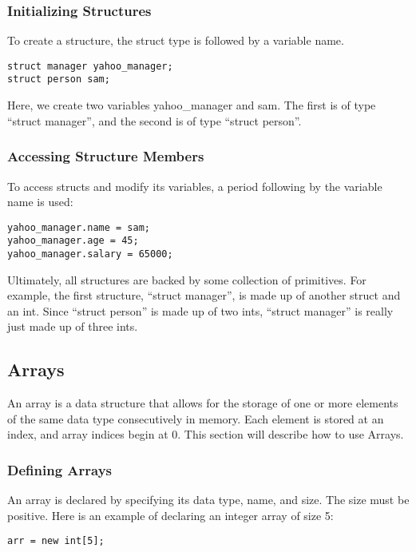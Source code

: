 \documentclass{article}
\begin{document}
\subsubsection{Initializing Structures}
To create a structure, the struct type is followed by a variable name. 
\begin{lstlisting}
struct manager yahoo_manager;
struct person sam;
\end{lstlisting}

Here, we create two variables yahoo\_manager and sam. The first is of type ``struct manager'', and the second is of type ``struct person''.

\subsubsection{Accessing Structure Members}

 To access structs and modify its variables, a period following by the variable name is used:

 \begin{lstlisting}
yahoo_manager.name = sam;
yahoo_manager.age = 45;
yahoo_manager.salary = 65000;
\end{lstlisting}

Ultimately, all structures are backed by some collection of primitives. For example, the first structure, ``struct manager'', is made up of another struct and an int. Since ``struct person'' is made up of two ints, ``struct manager'' is really just made up of three ints. 


\subsection{Arrays}
An array is a data structure that allows for the storage of one or more elements of the same data type consecutively in memory. Each element is stored at an index, and array indices begin at 0. This section will describe how to use Arrays.

\subsubsection{Defining Arrays}
An array is declared by specifying its data type, name, and size. The size must be positive. Here is an example of declaring an integer array of size 5:

 \begin{lstlisting}
arr = new int[5];
\end{lstlisting}
\end{document}
